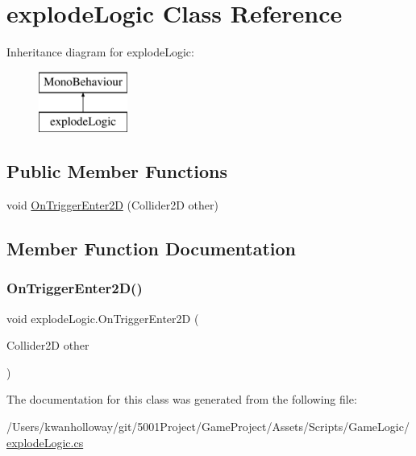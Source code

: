 \hypertarget{classexplode_logic}{}\section{explode\+Logic Class Reference}
\label{classexplode_logic}
Inheritance diagram for explode\+Logic\+:\begin{figure}[H]
\begin{center}
\leavevmode
\includegraphics[height=2.000000cm]{classexplode_logic}
\end{center}
\end{figure}
\subsection*{Public Member Functions}
\begin{DoxyCompactItemize}
\item 
void \hyperlink{classexplode_logic_a9c58298b6ca7bba45997d736618c6aca}{On\+Trigger\+Enter2D} (Collider2D other)
\end{DoxyCompactItemize}


\subsection{Member Function Documentation}
\mbox{\label{classexplode_logic_a9c58298b6ca7bba45997d736618c6aca}} 
\subsubsection{\texorpdfstring{On\+Trigger\+Enter2\+D()}{OnTriggerEnter2D()}}
{\footnotesize\ttfamily void explode\+Logic.\+On\+Trigger\+Enter2D (\begin{DoxyParamCaption}\item[{Collider2D}]{other }\end{DoxyParamCaption})}



The documentation for this class was generated from the following file\+:\begin{DoxyCompactItemize}
\item 
/\+Users/kwanholloway/git/5001\+Project/\+Game\+Project/\+Assets/\+Scripts/\+Game\+Logic/\hyperlink{explode_logic_8cs}{explode\+Logic.\+cs}\end{DoxyCompactItemize}
